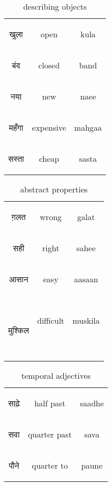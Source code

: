 \begin{table}[H]
    \centering
    \begin{tabular}{c|c|c}
        \begin{hindi} खुला \end{hindi} & open & kula \\
        \begin{hindi} बंद \end{hindi} & closed & band \\
        \begin{hindi} नया \end{hindi} & new & naee \\
        \begin{hindi} महँगा \end{hindi} & expensive & mahgaa \\
        \begin{hindi} सस्ता \end{hindi} & cheap & sasta \\
    \end{tabular}
    \caption{describing objects}
    \label{tab:adjectives_object_describing}
\end{table}

\begin{table}[H]
    \centering
    \begin{tabular}{c|c|c}
        \begin{hindi} ग़लत \end{hindi} & wrong & galat \\
        \begin{hindi} सही \end{hindi} & right & sahee \\
        \begin{hindi} आसान \end{hindi} &  easy & aasaan \\\
        \begin{hindi}मुश्किल \end{hindi} &  difficult & muskila \\\
    \end{tabular}
    \caption{abstract properties}
    \label{tab:adjectives_abstract}
\end{table}

\begin{table}[H]
    \centering
    \begin{tabular}{c|c|c}
        \begin{hindi} साढ़े \end{hindi} & half past  & saadhe \\
        \begin{hindi} सवा \end{hindi} & quarter past  & sava \\
        \begin{hindi} पौने \end{hindi} & quarter to  & paune \\
    \end{tabular}
    \caption{temporal adjectives}
    \label{tab:adjectives_temporal}
\end{table}


